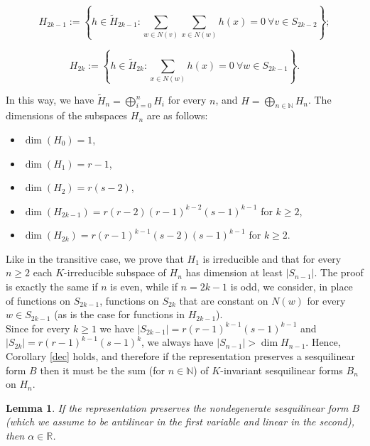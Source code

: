 \documentclass{article}
\theoremstyle{definition}
\theoremstyle{remark}
\theoremstyle{plain}
\newtheorem{lem}[dfn]{Lemma}
\begin{document}
$$H_{2k-1}:=\left\{h\in\widetilde{H}_{2k-1}: \sum_{w\in N(v)}{\sum_{x\in N(w)}{h(x)}}=0\ \forall v\in S_{2k-2}\right\};$$

$$H_{2k}:=\left\{h\in\widetilde{H}_{2k}: \sum_{x\in N(w)}{h(x)}=0\ \forall w\in S_{2k-1}\right\}.$$ 

In this way, we have $\widetilde{H}_n=\bigoplus_{i=0}^{n}{H_i}$ for every $n$, and $H=\bigoplus_{n\in\mathbb{N}}{H_{n}}$. The dimensions of the subspaces $H_n$ are as follows:

\begin{itemize}
    \item $\dim(H_0)=1$,
    \item $\dim(H_1)=r-1$,
    \item $\dim(H_2)=r(s-2)$,
    \item $\dim(H_{2k-1})=r(r-2)(r-1)^{k-2}(s-1)^{k-1}$ for $k\geq 2$,
    \item $\dim(H_{2k})=r(r-1)^{k-1}(s-2)(s-1)^{k-1}$ for $k\geq 2$. \\
\end{itemize}

Like in the transitive case, we prove that $H_1$ is irreducible and that for every $n\geq 2$ each $K$-irreducible subspace of $H_n$ has dimension at least $\vert S_{n-1}\vert$. The proof is exactly the same if $n$ is even, while if $n=2k-1$ is odd, we consider, in place of functions on $S_{2k-1}$, functions on $S_{2k}$ that are constant on $N(w)$ for every $w\in S_{2k-1}$ (as is the case for functions in $H_{2k-1}$). \\

Since for every $k\geq 1$ we have $\vert S_{2k-1}\vert=r(r-1)^{k-1}(s-1)^{k-1}$ and $\vert S_{2k}\vert=r(r-1)^{k-1}(s-1)^k$, we always have $\vert S_{n-1}\vert>\dim{H_{n-1}}$. Hence, Corollary \ref{dec} holds, and therefore if the representation preserves a sesquilinear form $B$ then it must be the sum (for $n\in\mathbb{N}$) of $K$-invariant sesquilinear forms $B_n$ on $H_n$. \\

\begin{lem} \label{alphar2}
If the representation preserves the nondegenerate sesquilinear form $B$ (which we assume to be antilinear in the first variable and linear in the second), then $\alpha\in\mathbb{R}$.
\end{lem}
\end{document}
